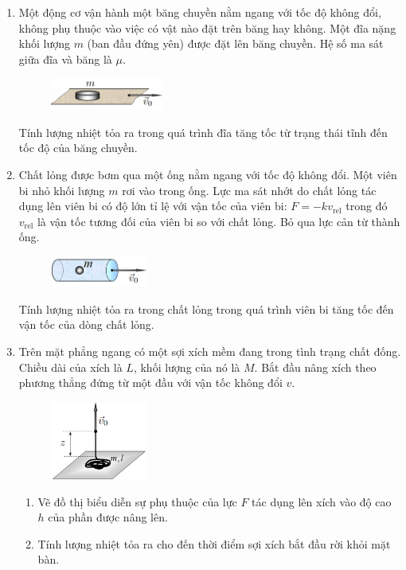\begin{enumerate}
  \item Một động cơ vận hành một băng chuyền nằm ngang với tốc độ không đổi, không phụ thuộc vào việc có vật nào đặt trên băng hay không. Một đĩa nặng khối lượng $m$ (ban đầu đứng yên) được đặt lên băng chuyền. Hệ số ma sát giữa đĩa và băng là $\mu$.
        \begin{figure}[H]
          \centering
          \includegraphics[width=0.35\textwidth]{Figures/Problems/Fig 1.1.png}
        \end{figure}
        \vspace{-0.5cm}
        Tính lượng nhiệt tỏa ra trong quá trình đĩa tăng tốc từ trạng thái tĩnh đến tốc độ của băng chuyền.
  \item Chất lỏng được bơm qua một ống nằm ngang với tốc độ không đổi. Một viên bi nhỏ khối lượng $m$ rơi vào trong ống. Lực ma sát nhớt do chất lỏng tác dụng lên viên bi có độ lớn tỉ lệ với vận tốc của viên bi: $F = -kv_{\text{rel}}$ trong đó $v_{\text{rel}}$ là vận tốc tương đối của viên bi so với chất lỏng. Bỏ qua lực cản từ thành ống.
        \begin{figure}[H]
          \centering
          \includegraphics[width=0.3\textwidth]{Figures/Problems/Fig 1.2.png}
        \end{figure}
        \vspace{-0.5cm}
        Tính lượng nhiệt tỏa ra trong chất lỏng trong quá trình viên bi tăng tốc đến vận tốc của dòng chất lỏng.
  \item Trên mặt phẳng ngang có một sợi xích mềm đang trong tình trạng chất đống. Chiều dài của xích là $L$, khối lượng của nó là $M$. Bắt đầu nâng xích theo phương thẳng đứng từ một đầu với vận tốc không đổi $v$.
        \begin{figure}[H]
          \centering
          \includegraphics[width=0.3\textwidth]{Figures/Problems/Fig 1.3.png}
        \end{figure}
        \begin{enumerate}
          \item Vẽ đồ thị biểu diễn sự phụ thuộc của lực $F$ tác dụng lên xích vào độ cao $h$ của phần được nâng lên.
          \item Tính lượng nhiệt tỏa ra cho đến thời điểm sợi xích bắt đầu rời khỏi mặt bàn.
        \end{enumerate}
\end{enumerate}